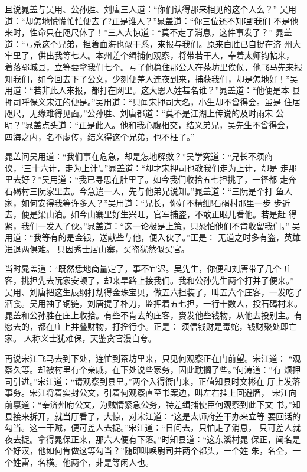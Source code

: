 且说晁盖与吴用、公孙胜、刘唐三人道：“你们认得那来相见的这个人么？”
吴用道：“却怎地慌慌忙忙便去了?正是谁人？”晁盖道：“你三位还不知哩!我们
不是他来时，性命只在咫尺休了！”三人大惊道：“莫不走了消息，这件事发了？”
晁盖道：“亏杀这个兄弟，担着血海也似干系，来报与我们。原来白胜已自捉在济
州大牢里了，供出我等七人。本州差个缉捕何观察，将带若干人，奉着太师钧帖来，
着落郓城县，立等要拿我们七个。亏了他稳住那公人在茶坊里俟候，他飞马先来报
知我们，如今回去下了公文，少刻便差人连夜到来，捕获我们，却是怎地好！”吴
用道：“若非此人来报，都打在网里。这大恩人姓甚名谁？”晁盖道：“他便是本
县押司呼保义宋江的便是。”吴用道：“只闻宋押司大名，小生却不曾得会。虽是
住居咫尺，无缘难得见面。”公孙胜、刘唐都道：“莫不是江湖上传说的及时雨宋
公明？”晁盖点头道：“正是此人。他和我心腹相交，结义弟兄，吴先生不曾得会，
四海之内，名不虚传，结义得这个兄弟，也不枉了。”

晁盖问吴用道：“我们事在危急，却是怎地解救？”吴学究道：“兄长不须商
议，‘三十六计，走为上计’。”晁盖道：“却才宋押司也教我们走为上计，却是
走那里去好？”吴用道：“我已寻思在肚里了。如今我们收拾五七担挑了，一径都
走奔石碣村三阮家里去。今急遣一人，先与他弟兄说知。”晁盖道：“三阮是个打
鱼人家，如何安得我等许多人？”吴用道：“兄长，你好不精细!石碣村那里一步
步近去，便是梁山泊。如今山寨里好生兴旺，官军捕盗，不敢正眼儿看他。若是赶
得紧，我们一发入了伙。”晁盖道：“这一论极是上策，只恐怕他们不肯收留我们。”
吴用道：“我等有的是金银，送献些与他，便入伙了。”正是：
无道之时多有盗，英雄进退两俱难。
只因秀士居山寨，买盗犹然似买官。

当时晁盖道：“既然恁地商量定了，事不宜迟。吴先生，你便和刘唐带了几个
庄客，挑担先去阮家安顿了，却来旱路上接我们。我和公孙先生两个打并了便来。”
吴用、刘唐把这生辰纲打劫得金珠宝贝，做五六担装了，叫五六个庄客，一发吃了
酒食。吴用袖了铜链，刘唐提了朴刀，监押着五七担，一行十数人，投石碣村来。
晁盖和公孙胜在庄上收拾。有些不肯去的庄客，赍发他些钱物，从他去投别主。有
愿去的，都在庄上并叠财物，打拴行李。正是：
须信钱财是毒蛇，钱财聚处即亡家。
人称义士犹难保，天鉴贪官漫自夸。

再说宋江飞马去到下处，连忙到茶坊里来，只见何观察正在门前望。宋江道：
“观察久等。却被村里有个亲戚，在下处说些家务，因此耽搁了些。”何涛道：“有
烦押司引进。”宋江道：“请观察到县里。”两个入得衙门来，正值知县时文彬在
厅上发落事务。宋江将着实封公文，引着何观察直至书案边，叫左右挂上回避牌，
宋江向前禀道：“奉济州府公文，为贼情紧急公务，特差缉捕使臣何观察到此下文
书。”知县接来拆开，就当厅看了，大惊，对宋江道：“这是太师府差干办来立等
要回话的勾当。这一干贼，便可差人去捉。”宋江道：“日间去，只怕走了消息，
只可差人就夜去捉。拿得晁保正来，那六人便有下落。”时知县道：“这东溪村晁
保正，闻名是个好汉，他如何肯做这等勾当？”随即叫唤尉司并两个都头，一个姓
朱，名仝，一个姓雷，名横。他两个，非是等闲人也。

